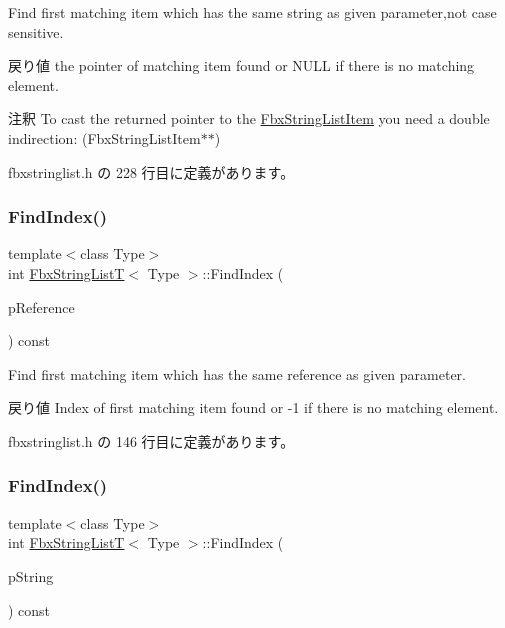 Find first matching item which has the same string as given parameter,not case sensitive. \begin{DoxyReturn}{戻り値}
the pointer of matching item found or N\+U\+LL if there is no matching element. 
\end{DoxyReturn}
\begin{DoxyRemark}{注釈}
To cast the returned pointer to the \hyperlink{class_fbx_string_list_item}{Fbx\+String\+List\+Item} you need a double indirection\+: (Fbx\+String\+List\+Item$\ast$$\ast$) 
\end{DoxyRemark}


 fbxstringlist.\+h の 228 行目に定義があります。

\mbox{\label{class_fbx_string_list_t_a96be804ab1570fc90a651cf6e40cda1f}} 
\subsubsection{\texorpdfstring{Find\+Index()}{FindIndex()}\hspace{0.1cm}{\footnotesize\ttfamily [1/2]}}
{\footnotesize\ttfamily template$<$class Type$>$ \\
int \hyperlink{class_fbx_string_list_t}{Fbx\+String\+ListT}$<$ Type $>$\+::Find\+Index (\begin{DoxyParamCaption}\item[{Fbx\+Handle}]{p\+Reference }\end{DoxyParamCaption}) const\hspace{0.3cm}{\ttfamily [inline]}}

Find first matching item which has the same reference as given parameter. \begin{DoxyReturn}{戻り値}
Index of first matching item found or -\/1 if there is no matching element. 
\end{DoxyReturn}


 fbxstringlist.\+h の 146 行目に定義があります。

\mbox{\label{class_fbx_string_list_t_a50609bf493c67a131c531409cbfe8f8b}} 
\subsubsection{\texorpdfstring{Find\+Index()}{FindIndex()}\hspace{0.1cm}{\footnotesize\ttfamily [2/2]}}
{\footnotesize\ttfamily template$<$class Type$>$ \\
int \hyperlink{class_fbx_string_list_t}{Fbx\+String\+ListT}$<$ Type $>$\+::Find\+Index (\begin{DoxyParamCaption}\item[{const char $\ast$}]{p\+String }\end{DoxyParamCaption}) const\hspace{0.3cm}{\ttfamily [inline]}}

